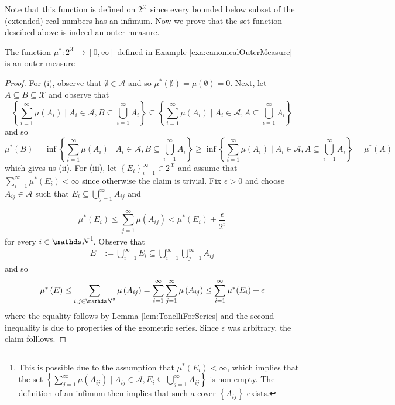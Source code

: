 Note that this function is defined on $2^{\mathcal{X}}$ since every
bounded below subset of the (extended) real numbers has an infimum.
Now we prove that the set-function descibed above is indeed an outer
measure.
\begin{prop}
\label{prop:canonicalOuterMeasureIsOuterMeasure}The function $\mu^{*}:2^{\mathcal{X}}\longrightarrow\left[0,\infty\right]$
defined in Example \ref{exa:canonicalOuterMeasure} is an outer measure
\end{prop}

\begin{proof}
For (i), observe that $\emptyset\in\mathcal{A}$ and so $\mu^{*}\left(\emptyset\right)=\mu\left(\emptyset\right)=0.$
Next, let $A\subseteq B\subseteq\mathcal{X}$ and observe that 
\[
\left\{ \sum_{i=1}^{\infty}\mu\left(A_{i}\right)\mid A_{i}\in\mathcal{A},B\subseteq\bigcup_{i=1}^{\infty}A_{i}\right\} \subseteq\left\{ \sum_{i=1}^{\infty}\mu\left(A_{i}\right)\mid A_{i}\in\mathcal{A},A\subseteq\bigcup_{i=1}^{\infty}A_{i}\right\} 
\]
and so 
\[
\mu^{*}\left(B\right)=\inf\left\{ \sum_{i=1}^{\infty}\mu\left(A_{i}\right)\mid A_{i}\in\mathcal{A},B\subseteq\bigcup_{i=1}^{\infty}A_{i}\right\} \geq\inf\left\{ \sum_{i=1}^{\infty}\mu\left(A_{i}\right)\mid A_{i}\in\mathcal{A},A\subseteq\bigcup_{i=1}^{\infty}A_{i}\right\} =\mu^{*}\left(A\right)
\]
which gives us (ii). For (iii), let $\left\{ E_{i}\right\} _{i=1}^{\infty}\in2^{\mathcal{X}}$
and assume that $\sum_{i=1}^{\infty}\mu^{*}\left(E_{i}\right)<\infty$
since otherwise the claim is trivial. Fix $\epsilon>0$ and choose
$A_{ij}\in\mathcal{A}$ such that $E_{i}\subseteq\bigcup_{j=1}^{\infty}A_{ij}$
and

\[
\mu^{*}\left(E_{i}\right)\leq\sum_{j=1}^{\infty}\mu(A_{ij})<\mu^{*}\left(E_{i}\right)+\frac{\epsilon}{2^{i}}
\]
for every $i\in\N$\footnote{This is possible due to the assumption that $\mu^{*}\left(E_{i}\right)<\infty$,
which implies that the set $\left\{ \sum_{j=1}^{\infty}\mu\left(A_{ij}\right)\mid A_{ij}\in\mathcal{A},E_{i}\subseteq\bigcup_{j=1}^{\infty}A_{ij}\right\} $
is non-empty. The definition of an infimum then implies that such
a cover $\left\{ A_{ij}\right\} $ exists.}. Observe that
\begin{align*}
E & :=\bigcup_{i=1}^{\infty}E_{i}\subseteq\bigcup_{i=1}^{\infty}\bigcup_{j=1}^{\infty}A_{ij}
\end{align*}
and so 
\[
\mu^{*}\left(E\right)\leq\sum_{i,j\in\N^{2}}\mu\left(A_{ij}\right)=\sum_{i=1}^{\infty}\sum_{j=1}^{\infty}\mu\left(A_{ij}\right)\leq\sum_{i=1}^{\infty}\mu^{*}(E_{i})+\epsilon
\]
where the equality follows by Lemma \ref{lem:TonelliForSeries} and
the second inequality is due to properties of the geometric series.
Since $\epsilon$ was arbitrary, the claim folllows.
\end{proof}
